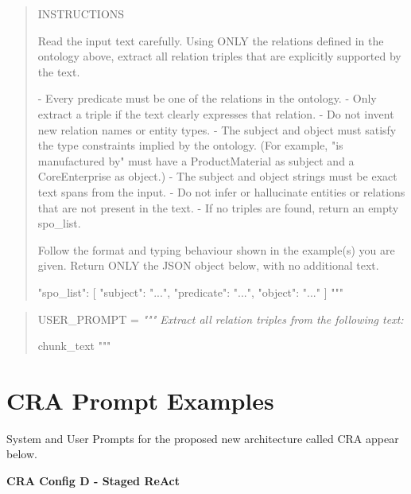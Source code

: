 \begin{quote}
{INSTRUCTIONS

Read the input text carefully. Using ONLY the relations defined in the ontology
above, extract all relation triples that are explicitly supported by the text.

- Every predicate must be one of the relations in the ontology.
- Only extract a triple if the text clearly expresses that relation.
- Do not invent new relation names or entity types.
- The subject and object must satisfy the type constraints implied by the ontology.
  (For example, "is manufactured by" must have a ProductMaterial as subject
   and a CoreEnterprise as object.)
- The subject and object strings must be exact text spans from the input.
- Do not infer or hallucinate entities or relations that are not present in the text.
- If no triples are found, return an empty spo\_list.

Follow the format and typing behaviour shown in the example(s) you are given.
Return ONLY the JSON object below, with no additional text.

{
  "spo\_list": [
    {"subject": "...", "predicate": "...", "object": "..."}
  ]
}
"""
}
\end{quote}


\begin{quote}
{
USER\_PROMPT = 
\itshape
"""
Extract all relation triples from the following text:

{chunk\_text}
"""
}
\end{quote}



\section{CRA Prompt Examples}
\label{app:cra_prompt_example}

System and User Prompts for the proposed new architecture called CRA appear below.  

\textbf{CRA Config D - Staged ReAct}


